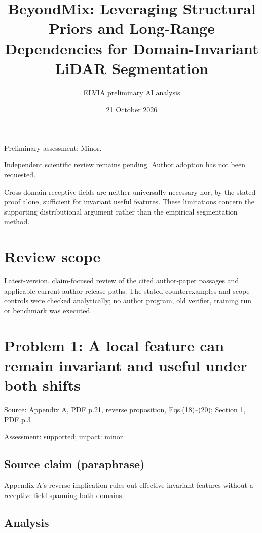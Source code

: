 \documentclass[11pt]{article}
\begin{document}
\title{BeyondMix: Leveraging Structural Priors and Long-Range Dependencies for Domain-Invariant LiDAR Segmentation}

\author{ELVIA preliminary AI analysis}\date{21 October 2026}\maketitle

Preliminary assessment: Minor.\par

Independent scientific review remains pending. Author adoption has not been requested.

Cross-domain receptive fields are neither universally necessary nor, by the stated proof alone, sufficient for invariant useful features. These limitations concern the supporting distributional argument rather than the empirical segmentation method.

\section*{Review scope}

Latest-version, claim-focused review of the cited author-paper passages and applicable current author-release paths. The stated counterexamples and scope controls were checked analytically; no author program, old verifier, training run or benchmark was executed.

\section*{Problem 1: A local feature can remain invariant and useful under both shifts}

Source: Appendix A, PDF p.21, reverse proposition, Eqs.(18)–(20); Section 1, PDF p.3

Assessment: supported; impact: minor

\subsection*{Source claim (paraphrase)}

Appendix A’s reverse implication rules out effective invariant features without a receptive field spanning both domains.

\subsection*{Analysis}
\end{document}
